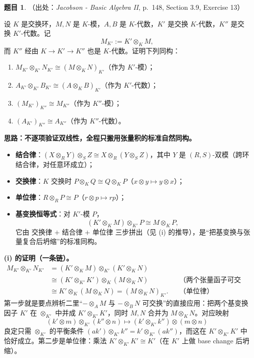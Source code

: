 \documentclass[a4paper]{ctexart}
\theoremstyle{definition}
\newtheorem{example}{题目}[section]
\theoremstyle{analysis}
\theoremstyle{plain}
\begin{document}
\begin{example}
（出处：\textit{Jacobson - Basic Algebra II}, p.~148, Section 3.9, Exercise 13）

设 \(K\) 是交换环，\(M,N\) 是 \(K\)-模，\(A,B\) 是 \(K\)-代数，\(K'\) 是交换 \(K\)-代数，\(K''\) 是交换 \(K'\)-代数。记
\[
  M_{K'}:=K'\otimes_K M,
\]
而 \(K''\) 经由 \(K\to K'\to K''\) 也是 \(K\)-代数。证明下列同构：
\begin{enumerate}
  \item \(M_{K'}\otimes_{K'}N_{K'}\cong(M\otimes_K N)_{K'}\)（作为 \(K'\)-模）；
  \item \(A_{K'}\otimes_{K'}B_{K'}\cong(A\otimes_K B)_{K'}\)（作为 \(K'\)-代数）；
  \item \((M_{K'})_{K''}\cong M_{K''}\)（作为 \(K''\)-模）；
  \item \((A_{K'})_{K''}\cong A_{K''}\)（作为 \(K''\)-代数）。
\end{enumerate}

\textbf{思路：不逐项验证双线性，全程只搬用张量积的标准自然同构。}
\begin{itemize}
  \item \textbf{结合律}：\((X\otimes_R Y)\otimes_S Z\cong X\otimes_R(Y\otimes_S Z)\)，其中 \(Y\) 是 \((R,S)\)-双模（跨环结合律，对任意环成立）；
  \item \textbf{交换律}：\(K\) 交换时 \(P\otimes_K Q\cong Q\otimes_K P\)（\(x\otimes y\mapsto y\otimes x\)）；
  \item \textbf{单位律}：\(R\otimes_R P\cong P\)（\(r\otimes p\mapsto rp\)）；
  \item \textbf{基变换恒等式}：对 \(K'\)-模 \(P\)，
  \[
    (K'\otimes_K M)\otimes_{K'}P\cong M\otimes_K P,
  \]
  它由 交换律 \(+\) 结合律 \(+\) 单位律 三步拼出（见 (i) 的推导），是``把基变换与张量复合后坍缩''的标准同构。
\end{itemize}

\textbf{(i) 的证明（一条链）。}
\[
\begin{aligned}
  M_{K'}\otimes_{K'}N_{K'}
  &=(K'\otimes_K M)\otimes_{K'}(K'\otimes_K N)\\
  &\cong (K'\otimes_{K'}K')\otimes_K(M\otimes_K N)
  &&\text{（两个张量函子可交换）}\\
  &\cong K'\otimes_K(M\otimes_K N)=(M\otimes_K N)_{K'}.
  &&\text{（单位律）}
\end{aligned}
\]
第一步就是要点辨析二里``\(-\otimes_AM\) 与 \(-\otimes_BN\) 可交换''的直接应用：把两个基变换因子 \(K'\) 在 \(\otimes_{K'}\) 中并成 \(K'\otimes_{K'}K'\)，同时 \(M,N\) 合并为 \(M\otimes_KN\)。对应映射
\[
  (k'\otimes m)\otimes_{K'}(k''\otimes n)\longmapsto(k'\otimes_{K'}k'')\otimes(m\otimes n)
\]
良定只需 \(\otimes_{K'}\) 的平衡条件 \((ak')\otimes_{K'}k''=k'\otimes_{K'}(ak'')\)，而这在 \(K'\otimes_{K'}K'\) 中恰好成立。第二步是单位律：乘法 \(K'\otimes_{K'}K'\cong K'\)（在 \(K'\) 上做 base change 后坍缩）。


\end{example}
\end{document}
